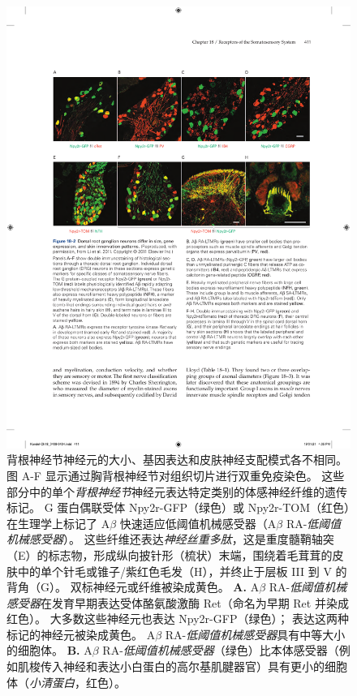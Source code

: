 \begin{figure}[htbp]
	\centering
	\includegraphics[width=1.0\linewidth]{chap18/fig_18_2}
	\caption{背根神经节神经元的大小、基因表达和皮肤神经支配模式各不相同\cite{li2011functional}。
		图 A-F 显示通过胸背根神经节对组织切片进行双重免疫染色。
		这些部分中的单个\textit{背根神经节}神经元表达特定类别的体感神经纤维的遗传标记。
		G 蛋白偶联受体 Npy2r-GFP（绿色）或 Npy2r-TOM（红色）在生理学上标记了 A$\beta$ 快速适应低阈值机械感受器（A$\beta$ RA-\textit{低阈值机械感受器}）。
		这些纤维还表达\textit{神经丝重多肽}，这是重度髓鞘轴突（E）的标志物，形成纵向披针形（梳状）末端，围绕着毛茸茸的皮肤中的单个针毛或锥子/紫红色毛发（H），并终止于层板 III 到 V 的背角（G）。 
		双标神经元或纤维被染成黄色。
		\textbf{A.} A$\beta$ RA-\textit{低阈值机械感受器}在发育早期表达受体酪氨酸激酶 Ret（命名为早期 Ret 并染成红色）。
		大多数这些神经元也表达 Npy2r-GFP（绿色）；
		表达这两种标记的神经元被染成黄色。 A$\beta$ RA-\textit{低阈值机械感受器}具有中等大小的细胞体。
		\textbf{B.} A$\beta$ RA-\textit{低阈值机械感受器}（绿色）比本体感受器（例如肌梭传入神经和表达小白蛋白的高尔基肌腱器官）具有更小的细胞体（\textit{小清蛋白}，红色）。
}
\end{figure}
